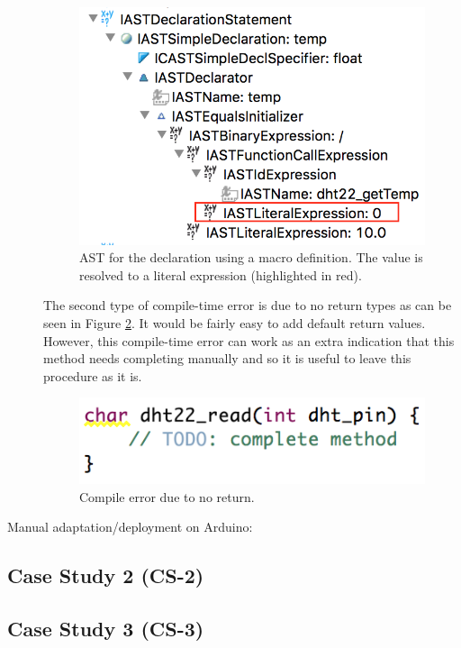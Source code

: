 \documentclass{UoYCSproject}
\begin{document}
\begin{description}
\begin{figure}[h!]
  \centering
  \includegraphics[width=0.5\linewidth]{graphics/celsius_ast.png}
  \caption{AST for the declaration using a macro definition. The value is resolved to a literal expression (highlighted in red).}
  \label{fig:celsius_ast}
\end{figure}

The second type of compile-time error is due to no return types as can be seen in Figure \ref{fig:return_type_error}. It would be fairly easy to add default return values. However, this compile-time error can work as an extra indication that this method needs completing manually and so it is useful to leave this procedure as it is.

\begin{figure}[h!]
  \centering
  \includegraphics[width=0.5\linewidth]{graphics/return_type_error.png}
  \caption{Compile error due to no return.}
  \label{fig:return_type_error}
\end{figure}
\item[Manual adaptation/deployment on Arduino:] %
\end{description}


\subsection{Case Study 2 (CS-2)}

\subsection{Case Study 3 (CS-3)}
\end{document}
